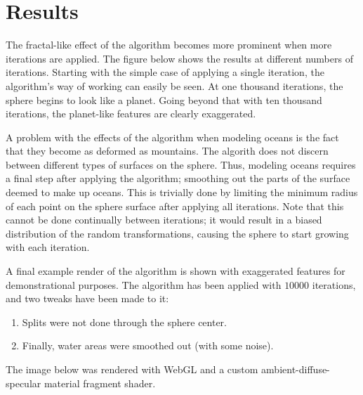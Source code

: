 \chapter{Results}

The fractal-like effect of the algorithm becomes more prominent when more iterations are applied.  The figure below shows the results at different numbers of iterations.  Starting with the simple case of applying a single iteration, the algorithm's way of working can easily be seen.  At one thousand iterations, the sphere begins to look like a planet.  Going beyond that with ten thousand iterations, the planet-like features are clearly exaggerated.


A problem with the effects of the algorithm when modeling oceans is the fact that they become as
deformed as mountains.  The algorith does not discern between different types of surfaces on the
sphere.  Thus, modeling oceans requires a final step after applying the algorithm; smoothing out the
parts of the surface deemed to make up oceans.  This is trivially done by limiting the minimum
radius of each point on the sphere surface after applying all iterations.  Note that this cannot be
done continually between iterations; it would result in a biased distribution of the random
transformations, causing the sphere to start growing with each iteration.

A final example render of the algorithm is shown with exaggerated features for demonstrational
purposes.  The algorithm has been applied with $10000$ iterations, and two tweaks have been made to
it:

\begin{enumerate}
  \itemsep0em
  \item Splits were not done through the sphere center.
  \item Finally, water areas were smoothed out (with some noise).
\end{enumerate}

\noindent The image below was rendered with WebGL and a custom ambient-diffuse-specular material
fragment shader.


